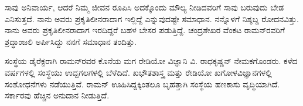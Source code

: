 ಸಾವು ಅನಿವಾರ್ಯ, ಆದರೆ ನಿಮ್ಮ ಜೀವನ ರೂಪಿಸಿ ಅದಕ್ಕೊಂದು ಮೌಲ್ಯ ನೀಡಿದವರಿಗೆ ಸಾವು ಬರುವುದು ಬೇಡ ಎನಿಸುತ್ತದೆ. ನಾನು ಅವರು ಪ್ರಕೃತಿಲೀನರಾದಾಗ ಇಲ್ಲಿದ್ದೆ ಎನ್ನುವುದಷ್ಟೇ ಸಮಾಧಾನ. ನನ್ನೊಳಗೆ ನಿಶ್ಶಬ್ದ ರೋದನವಿತ್ತು. ನಾನು ಅವರು ಪ್ರಕೃತಿಲೀನರಾದಾಗ ಇರದಿದ್ದರೆ ಬಹಳ ಬೇಸರ ಪಡುತ್ತಿದ್ದೆ. ಚಂದ್ರಶೇಖರ ವೆಂಕಟ ರಾಮನ್‍ರವರಿಗೆ ಶ್ರದ್ಧಾಂಜಲಿ ಅರ್ಪಿಸಿದ್ದು ನನಗೆ ಸಮಾಧಾನ ತಂದಿತ್ತು.

ಸಂಸ್ಥೆಯ ಡೈರೆಕ್ಟರಾಗಿ ರಾಮನ್‍ರವರ ಕೊನೆಯ ಮಗ ರೇಡಿಯೋ ವಿಜ್ಞಾನಿ ವಿ. ರಾಧಕೃಷ್ಣನ್ ನೇಮಕಗೊಂಡರು. ಕಳೆದ  ವರ್ಷಗಳಲ್ಲಿ ಸಂಸ್ಥೆಯು ಉದ್ದಗಲಗಳಲ್ಲಿ ಬೆಳೆದಿದೆ. ಖಭೌತಶಾಸ್ತ್ರ ಮತ್ತು ರೇಡಿಯೋ ಖಗೋಳವಿಜ್ಞಾನಗಳಲ್ಲಿ ಸಂಶೋಧನೆಗಳು ನಡೆಯುತ್ತಿವೆ. ರಾಮನ್ ಊಹಿಸಿದ್ದಕ್ಕಿಂತಲೂ ಬೃಹತ್ತಾಗಿ ಸಂಸ್ಥೆಯ ಹಣಕಾಸು ವೃದ್ಧಿಯಾಗಿದೆ. ಸರ್ಕಾರವು ಹೆಚ್ಚಿನ ಅನುದಾನ ನೀಡುತ್ತಿದೆ.


